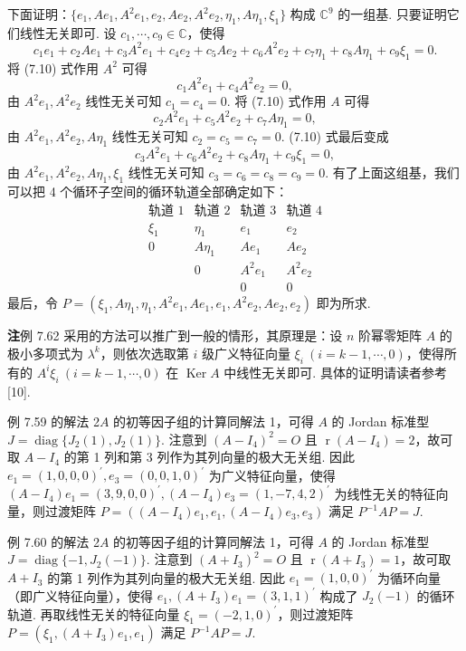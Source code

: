 \documentclass[UTF8,12pt,a4paper,fontset=fandol]{ctexart}
\begin{document}
下面证明：$\{e_1,Ae_1,A^2e_1,e_2,Ae_2,A^2e_2,\eta_1,A\eta_1,\xi_1\}$ 构成 $\mathbb{C}^9$ 的一组基. 只要证明它们线性无关即可. 设 $c_1,\cdots,c_9\in\mathbb{C}$，使得
\begin{equation}
c_1e_1+c_2Ae_1+c_3A^2e_1+c_4e_2+c_5Ae_2+c_6A^2e_2+c_7\eta_1+c_8A\eta_1+c_9\xi_1=0.
\tag{7.10}
\end{equation}
将 (7.10) 式作用 $A^2$ 可得
\[
c_1A^2e_1+c_4A^2e_2=0,
\]
由 $A^2e_1,A^2e_2$ 线性无关可知 $c_1=c_4=0$. 将 (7.10) 式作用 $A$ 可得
\[
c_2A^2e_1+c_5A^2e_2+c_7A\eta_1=0,
\]
由 $A^2e_1,A^2e_2,A\eta_1$ 线性无关可知 $c_2=c_5=c_7=0$. (7.10) 式最后变成
\[
c_3A^2e_1+c_6A^2e_2+c_8A\eta_1+c_9\xi_1=0,
\]
由 $A^2e_1,A^2e_2,A\eta_1,\xi_1$ 线性无关可知 $c_3=c_6=c_8=c_9=0$. 有了上面这组基，我们可以把 4 个循环子空间的循环轨道全部确定如下：
\[
\begin{array}{cccc}
\text{轨道 1} & \text{轨道 2} & \text{轨道 3} & \text{轨道 4}\\
\xi_1 & \eta_1 & e_1 & e_2\\
0 & A\eta_1 & Ae_1 & Ae_2\\
 & 0 & A^2e_1 & A^2e_2\\
 & & 0 & 0
\end{array}
\]
最后，令 $P=(\xi_1,A\eta_1,\eta_1,A^2e_1,Ae_1,e_1,A^2e_2,Ae_2,e_2)$ 即为所求.

\noindent\textbf{注}\quad 例 7.62 采用的方法可以推广到一般的情形，其原理是：设 $n$ 阶幂零矩阵 $A$ 的极小多项式为 $\lambda^k$，则依次选取第 $i$ 级广义特征向量 $\xi_i\ (i=k-1,\cdots,0)$，使得所有的 $A^i\xi_i\ (i=k-1,\cdots,0)$ 在 $\operatorname{Ker}A$ 中线性无关即可. 具体的证明请读者参考 [10].

例 7.59 的解法 2\quad $A$ 的初等因子组的计算同解法 1，可得 $A$ 的 Jordan 标准型 $J=\operatorname{diag}\{J_2(1),J_2(1)\}$. 注意到 $(A-I_4)^2=O$ 且 $\operatorname{r}(A-I_4)=2$，故可取 $A-I_4$ 的第 1 列和第 3 列作为其列向量的极大无关组. 因此 $e_1=(1,0,0,0)^{\prime},e_3=(0,0,1,0)^{\prime}$ 为广义特征向量，使得 $(A-I_4)e_1=(3,9,0,0)^{\prime},(A-I_4)e_3=(1,-7,4,2)^{\prime}$ 为线性无关的特征向量，则过渡矩阵 $P=((A-I_4)e_1,e_1,(A-I_4)e_3,e_3)$ 满足 $P^{-1}AP=J$.

例 7.60 的解法 2\quad $A$ 的初等因子组的计算同解法 1，可得 $A$ 的 Jordan 标准型 $J=\operatorname{diag}\{-1,J_2(-1)\}$. 注意到 $(A+I_3)^2=O$ 且 $\operatorname{r}(A+I_3)=1$，故可取 $A+I_3$ 的第 1 列作为其列向量的极大无关组. 因此 $e_1=(1,0,0)^{\prime}$ 为循环向量（即广义特征向量），使得 $e_1,(A+I_3)e_1=(3,1,1)^{\prime}$ 构成了 $J_2(-1)$ 的循环轨道. 再取线性无关的特征向量 $\xi_1=(-2,1,0)^{\prime}$，则过渡矩阵 $P=(\xi_1,(A+I_3)e_1,e_1)$ 满足 $P^{-1}AP=J$.
\end{document}

